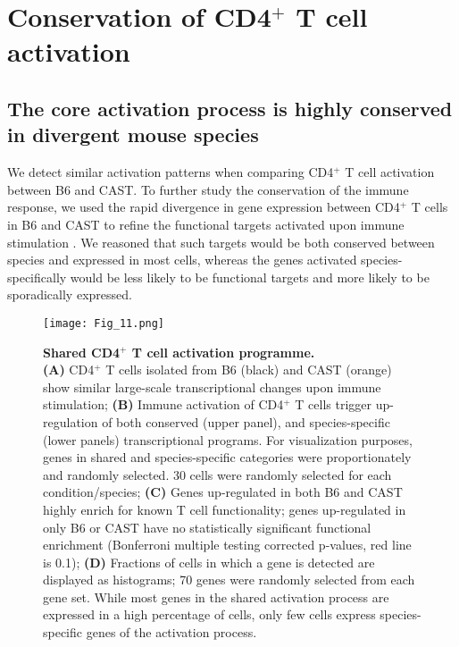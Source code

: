 \section{Conservation of CD4$^+$ T cell activation}
\subsection*{The core activation process is highly conserved in divergent mouse species}

We detect similar activation patterns when comparing CD4$^+$ T cell activation between B6 and CAST. To further study the conservation of the immune response, we used the rapid divergence in gene expression between CD4$^+$ T cells in B6 and CAST to refine the functional targets activated upon immune stimulation \citep{Shay2013}. We reasoned that such targets would be both conserved between species and expressed in most cells, whereas the genes activated species-specifically would be less likely to be functional targets and more likely to be sporadically expressed.\\

\begin{figure}[!ht]
\centering
\texttt{[image: Fig\_11.png]}
\caption[Shared CD4$^+$ T cell activation programme]{\textbf{Shared CD4$^+$ T cell activation programme.}\\
\textbf{(A)} CD4$^+$ T cells isolated from B6 (black) and CAST (orange) show similar large-scale transcriptional changes upon immune stimulation; \textbf{(B)} Immune activation of CD4$^+$ T cells trigger up-regulation of both conserved (upper panel), and species-specific (lower panels) transcriptional programs. For visualization purposes, genes in shared and species-specific categories were proportionately and randomly selected. 30 cells were randomly selected for each condition/species; \textbf{(C)} Genes up-regulated in both B6 and CAST highly enrich for known T cell functionality; genes up-regulated in only B6 or CAST have no statistically significant functional enrichment (Bonferroni multiple testing corrected p-values, red line is 0.1); \textbf{(D)} Fractions of cells in which a gene is detected are displayed as histograms; 70 genes were randomly selected from each gene set. While most genes in the shared activation process are expressed in a high percentage of cells, only few cells express species-specific genes of the activation process.}
\label{fig1:shared_activation}
\end{figure}


